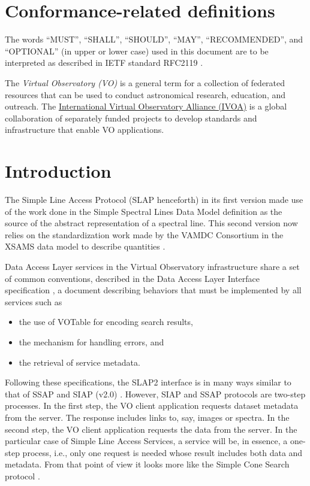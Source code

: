 \documentclass[11pt,a4paper]{ivoa}
\begin{document}
\section*{Conformance-related definitions}


The words ``MUST'', ``SHALL'', ``SHOULD'', ``MAY'', ``RECOMMENDED'', and
``OPTIONAL'' (in upper or lower case) used in this document are to be
interpreted as described in IETF standard RFC2119 \citep{std:RFC2119}.

The \emph{Virtual Observatory (VO)} is a
general term for a collection of federated resources that can be used
to conduct astronomical research, education, and outreach.
The \href{http://www.ivoa.net}{International
Virtual Observatory Alliance (IVOA)} is a global
collaboration of separately funded projects to develop standards and
infrastructure that enable VO applications.

\section{Introduction}

The Simple Line Access Protocol (SLAP henceforth) in its first version \citep{2010ivoa.specQ1209O} made
use of the work done in the Simple Spectral Lines Data Model definition \citep{2010ivoa.spec.1209O} as the source of
the abstract representation of
a spectral line. This second version now relies on the standardization work made by
the VAMDC Consortium in the XSAMS data model to describe quantities \citep{std:XSAMS12.07}.

Data Access Layer services in the Virtual Observatory infrastructure share a
set of common conventions, described in the Data Access Layer Interface specification
\citep{2017ivoa.spec.0517D}, a document describing behaviors that must be
implemented by all services such as

\begin{itemize}
\item the use of VOTable for encoding search results,
\item the mechanism for handling errors, and
\item the retrieval of service metadata.
\end{itemize}

Following these specifications, the SLAP2 interface is in many ways
similar to that of SSAP \citep{2012ivoa.spec.0210T} and SIAP (v2.0)
\citep{2015ivoa.spec.1223D}.  However, SIAP and SSAP protocols are
two-step processes. In the first step, the VO client application
requests dataset metadata from the server. The response includes links to, say,
images or spectra. In the second step, the VO client application
requests the data from the server. In the particular case of Simple Line
Access Services, a service will be, in essence, a one-step process,
i.e., only one request is needed whose result includes both data and metadata. From that point
of view it looks more like the Simple Cone Search protocol
\citep{2008ivoa.specQ0222P}.
\end{document}
